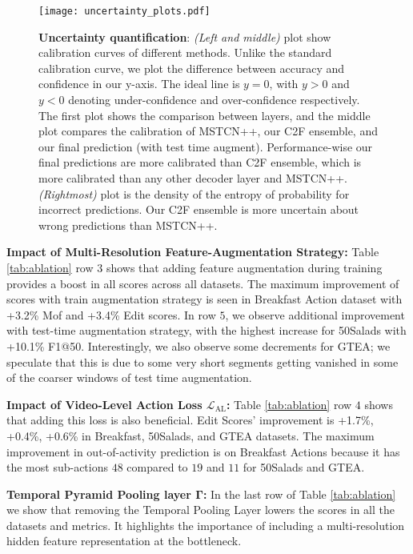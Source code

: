 \documentclass[10pt,twocolumn,letterpaper]{article}
\newcommand{\calL}{\mathcal{L}}
\newcommand{\bottle}{\ensuremath{\mathbf{\Gamma}}}
\begin{document}
\begin{figure*}
\begin{center}
\texttt{[image: uncertainty\_plots.pdf]}
\end{center}
\caption{\textbf{Uncertainty quantification}: \textit{(Left and middle)} plot show calibration curves of different methods. Unlike the standard calibration curve, we plot the difference between accuracy and confidence in our y-axis. The ideal line is $y\!=\!0$, with $y\!>\!0$ and $y\!<\!0$ denoting under-confidence and over-confidence respectively. The first plot shows the comparison between layers, and the middle plot compares the calibration of MSTCN++, our C2F ensemble, and our final prediction (with test time augment). Performance-wise our final predictions are more calibrated than C2F ensemble, which is more calibrated than any other decoder layer and MSTCN++. \textit{(Rightmost)} plot is the density of the entropy of probability for incorrect predictions. Our C2F ensemble is more uncertain about wrong predictions than MSTCN++.}
\label{fig:uncertainty}
\end{figure*}

\textbf{Impact of Multi-Resolution Feature-Augmentation Strategy:} Table \ref{tab:ablation} row $3$ shows that adding feature augmentation during training provides a boost in all scores across all datasets.
The maximum improvement of scores with train augmentation strategy is seen in Breakfast Action dataset with +3.2\% Mof and +3.4\% Edit scores. In row $5$, we observe additional improvement with test-time augmentation strategy, with the highest increase for 50Salads with +10.1\% F1@50. Interestingly, we also observe some decrements for GTEA; we speculate that this is due to some very short segments getting vanished in some of the coarser windows of test time augmentation. 

\textbf{Impact of Video-Level Action Loss $\calL_{\text{AL}}$:} Table \ref{tab:ablation} row $4$ shows that adding this loss is also beneficial.  
Edit Scores' improvement is +1.7\%, +0.4\%, +0.6\% in Breakfast, 50Salads, and GTEA datasets. The maximum improvement in out-of-activity prediction is on Breakfast Actions because it has the most sub-actions $48$ compared to $19$ and $11$ for 50Salads and GTEA.

\textbf{Temporal Pyramid Pooling layer \bottle:} In the last row of Table \ref{tab:ablation} we show that removing the Temporal Pooling Layer lowers the scores in all the datasets and metrics.  It highlights the importance of including a multi-resolution hidden feature representation at the bottleneck.
\end{document}

